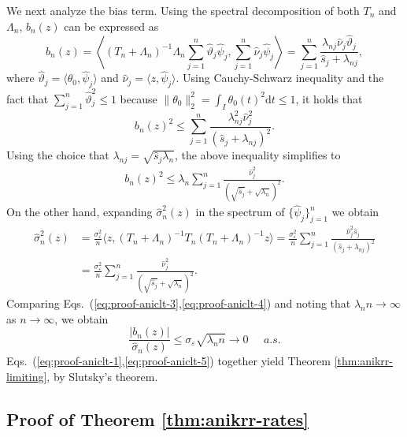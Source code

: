 \documentclass[11pt,a4paper]{article}
\renewcommand{\hat}{\widehat}
\theoremstyle{definition}
\theoremstyle{plain}
\theoremstyle{remark}
\newcommand{\ud}{\mathrm d}
\begin{document}
We next analyze the bias term. Using the spectral decomposition of both $T_n$ and $\Lambda_n$, $b_n(z)$ can be expressed as
$$
b_n(z) = \left\langle(T_n+\Lambda_n)^{-1}\Lambda_n\sum_{j=1}^n\hat\vartheta_j\hat\psi_j, \sum_{j=1}^n\hat\nu_j\hat\psi_j\right\rangle = \sum_{j=1}^n\frac{\lambda_{nj}\hat\nu_j\hat\vartheta_j}{\hat s_j+\lambda_{nj}},
$$
where $\hat\vartheta_j=\langle\theta_0,\hat\psi_j\rangle$ and $\hat\nu_j = \langle z,\hat\psi_j\rangle$.
Using Cauchy-Schwarz inequality and the fact that $\sum_{j=1}^n\hat\vartheta_j^2\leq 1$ because $\|\theta_0\|_2^2 = \int_I\theta_0(t)^2\ud t\leq 1$, it holds that
$$
b_n(z)^2 \leq \sum_{j=1}^n\frac{\lambda_{nj}^2\hat\nu_j^2}{(\hat s_j+\lambda_{nj})^2}.
$$
Using the choice that $\lambda_{nj}=\sqrt{\hat s_j\lambda_n}$, the above inequality simplifies to
\begin{align}
b_n(z)^2 \leq \lambda_n\sum_{j=1}^n\frac{\hat\nu_j^2}{(\sqrt{\hat s_j}+\sqrt{\lambda_n})^2}.
\label{eq:proof-aniclt-3}
\end{align}
On the other hand, expanding $\hat\sigma_n^2(z)$ in the spectrum of $\{\hat\psi_j\}_{j=1}^n$ we obtain
\begin{align}
\hat\sigma_n^2(z) &= \frac{\sigma_\varepsilon^2}{n}\langle z, (T_n+\Lambda_n)^{-1}T_n(T_n+\Lambda_n)^{-1}z\rangle = \frac{\sigma_\varepsilon^2}{n}\sum_{j=1}^n\frac{\hat\nu_j^2\hat s_j}{(\hat s_j+\lambda_{nj})^2}\nonumber\\
&=  \frac{\sigma_\varepsilon^2}{n}\sum_{j=1}^n\frac{\hat\nu_j^2}{(\sqrt{\hat s_j}+\sqrt{\lambda_n})^2}.
\label{eq:proof-aniclt-4}
\end{align}
Comparing Eqs.~(\ref{eq:proof-aniclt-3},\ref{eq:proof-aniclt-4}) and noting that $\lambda_n n\to\infty$ as $n\to\infty$, we obtain
\begin{equation}
\frac{|b_n(z)|}{\hat\sigma_n(z)} \leq \sigma_\varepsilon\sqrt{\lambda_n n} \to 0\;\;\;\;\;a.s.
\label{eq:proof-aniclt-5}
\end{equation}
Eqs.~(\ref{eq:proof-aniclt-1},\ref{eq:proof-aniclt-5}) together yield Theorem \ref{thm:anikrr-limiting}, by Slutsky's theorem.

\subsection{Proof of Theorem \ref{thm:anikrr-rates}}
\end{document}
